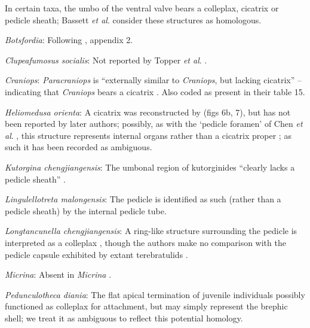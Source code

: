 \documentclass[openany]{book}
\theoremstyle{definition}
\theoremstyle{definition}
\theoremstyle{definition}
\theoremstyle{remark}
\begin{document}
In certain taxa, the umbo of the ventral valve bears a colleplax,
cicatrix or pedicle sheath; Bassett \emph{et al}.
\citeyearpar{Bassett2008Earlyontogeny} consider these structures as
homologous.

\hypertarget{Botsfordia-coding-103}{}
\emph{Botsfordia}: Following \citet{Williams1998Thediversity}, appendix
2.

\hypertarget{Clupeafumosus_socialis-coding-103}{}
\emph{Clupeafumosus socialis}: Not reported by Topper \emph{et al}.
\citeyearpar{Topper2013Reappraisalof}.

\hypertarget{Craniops-coding-103}{}
\emph{Craniops}: \emph{Paracraniops} is ``externally similar to
\emph{Craniops}, but lacking cicatrix'' -- indicating that
\emph{Craniops} bears a cicatrix
\citep{Williams2000LinguliformeaCraniiformea}. Also coded as present in
their table 15.

\hypertarget{Heliomedusa_orienta-coding-103}{}
\emph{Heliomedusa orienta}: A cicatrix was reconstructed by
\citet{Jin1992Revisionof} (figs 6b, 7), but has not been reported by
later authors; possibly, as with the `pedicle foramen' of Chen \emph{et
al}. \citeyearpar{Chen2007Reinterpretationof}, this structure represents
internal organs rather than a cicatrix proper
\citep{Zhang2009Architectureand}; as such it has been recorded as
ambiguous.

\hypertarget{Kutorgina_chengjiangensis-coding-103}{}
\emph{Kutorgina chengjiangensis}: The umbonal region of kutorginides
``clearly lacks a pedicle sheath'' \citep{Holmer2018Theattachment}.

\hypertarget{Lingulellotreta_malongensis-coding-103}{}
\emph{Lingulellotreta malongensis}: The pedicle is identified as such
(rather than a pedicle sheath) by the internal pedicle tube.

\hypertarget{Longtancunella_chengjiangensis-coding-103}{}
\emph{Longtancunella chengjiangensis}: A ring-like structure surrounding
the pedicle is interpreted as a colleplax
\citep{Zhang2011Theexceptionally}, though the authors make no comparison
with the pedicle capsule exhibited by extant terebratulids
\citep[see][]{Holmer2018Evolutionarysignificance}.

\hypertarget{Micrina-coding-103}{}
\emph{Micrina}: Absent in \emph{Micrina} \citep{Holmer2011Firstrecord}.

\hypertarget{Pedunculotheca_diania-coding-103}{}
\emph{Pedunculotheca diania}: The flat apical termination of juvenile
individuals possibly functioned as colleplax for attachment, but may
simply represent the brephic shell; we treat it as ambiguous to reflect
this potential homology.
\end{document}
